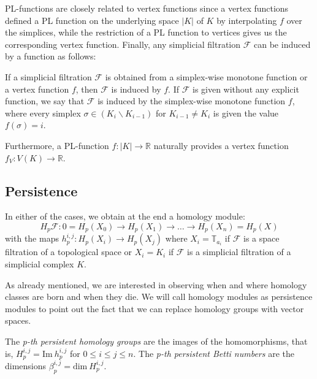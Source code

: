       PL-functions are closely related to vertex functions since a vertex functions defined a PL function on the underlying space $|K|$ of $K$ by interpolating $f$ over the simplices, while the restriction of a PL function to vertices gives us the corresponding vertex function. Finally, any simplicial filtration $\mathcal{F}$ can be induced by a function as follows:

      \begin{definition}
        If a simplicial filtration $\mathcal{F}$ is obtained from a simplex-wise monotone function or a vertex function $f$, then $\mathcal{F}$ is induced by $f$. If $\mathcal{F}$ is given without any explicit function, we say that $\mathcal{F}$ is induced by the simplex-wise monotone function $f$, where every simplex $\sigma \in (K_{i} \backslash K_{i-1})$ for $K_{i-1} \ne K_{i}$ is given the value $f(\sigma) = i$.
      \end{definition}

Furthermore, a PL-function $f: |K| \to \mathbb{R}$ naturally provides a vertex function $f_{V}: V(K) \to \mathbb{R}$.

\subsection{Persistence}
In either of the cases, we obtain at the end a homology module:
\begin{equation*}
H_{p}\mathcal{F}:0 = H_{p}(X_{0}) \to H_{p}(X_{1}) \to \ldots \to H_{p}(X_{n}) = H_{p}(X)
\end{equation*}
with the maps $h^{i,j}_{p}: H_{p}(X_{i}) \to H_{p}(X_{j})$ where $X_{i} = \mathbb{T}_{a_{i}}$ if $\mathcal{F}$ is a space filtration of a topological space or $X_{i} = K_{i}$ if $\mathcal{F}$ is a simplicial filtration of a simplicial complex $K$.

As already mentioned, we are interested in observing when and where homology classes are born and when they die. We will call homology modules as persistence modules to point out the fact that we can replace homology groups with vector spaces.

\begin{definition}
  The \textit{p-th persistent homology groups} are the images of the homomorphisms, that is, $H^{i,j}_{p} = \text{Im}\:h^{i,j}_{p}$ for $0 \leq i \leq j \leq n$. The \textit{p-th persistent Betti numbers} are the dimensions $\beta^{i,j}_{p} = \text{dim}\:H^{i,j}_{p}$.
\end{definition}

